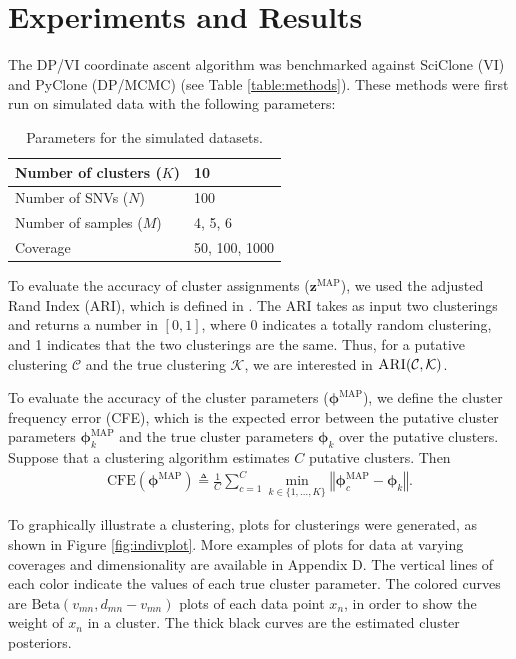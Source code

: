 \documentclass[11pt]{article}
\newcommand{\bz}{\ensuremath{\mathbf{z}}}
\newcommand{\bphi}{\ensuremath{\bm{\phi}}}
\begin{document}
\section{Experiments and Results}

The DP/VI coordinate ascent algorithm was benchmarked against SciClone (VI) and PyClone (DP/MCMC) (see Table \ref{table:methods}). These methods were first run on simulated data with the following parameters:

\begin{table}[ht]
\centering
\begin{tabular}{| l | l |}
\hline
Number of clusters ($K$) & 10            \\ \hline
Number of SNVs ($N$)     & 100           \\ \hline
Number of samples ($M$)  & 4, 5, 6       \\ \hline
Coverage                 & 50, 100, 1000  \\ \hline
\end{tabular}
\caption{Parameters for the simulated datasets.}
\label{table:simulateddata}
\end{table}

To evaluate the accuracy of cluster assignments ($\bz^{\text{MAP}}$), we used the adjusted Rand Index (ARI), which is defined in \cite{Rand1971}. The ARI takes as input two clusterings and returns a number in $[0,1]$, where 0 indicates a totally random clustering, and 1 indicates that the two clusterings are the same. Thus, for a putative clustering $\mathcal{C}$ and the true clustering $\mathcal{K}$, we are interested in $\textsc{ARI}(\mathcal{C}, \mathcal{K})$.

To evaluate the accuracy of the cluster parameters ($\bphi^{\text{MAP}}$), we define the cluster frequency error (CFE), which is the expected error between the putative cluster parameters $\bphi^{\text{MAP}}_k$ and the true cluster parameters $\bphi_k$ over the putative clusters. Suppose that a clustering algorithm estimates $C$ putative clusters. Then
\begin{align}
\text{CFE}(\bphi^{\text{MAP}}) \triangleq  \frac{1}{C} \sum_{c=1}^C \min_{k \in \{1, \ldots, K\}}  \left\Vert \bphi_c^{\text{MAP}} - \bphi_k \right\Vert.
\end{align}

To graphically illustrate a clustering, plots for clusterings were generated, as shown in Figure \ref{fig:indivplot}. More examples of plots for data at varying coverages and dimensionality are available in Appendix D. The vertical lines of each color indicate the values of each true cluster parameter. The colored curves are $\text{Beta}(v_{mn}, d_{mn} - v_{mn})$ plots of each data point $x_n$, in order to show the weight of $x_n$ in a cluster. The thick black curves are the estimated cluster posteriors.
\end{document}
